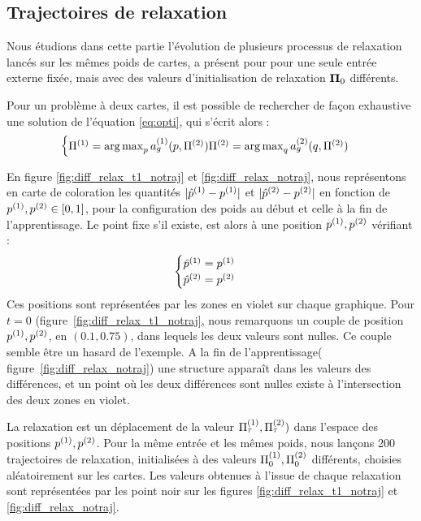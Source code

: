 \documentclass[../main]{subfiles}
\begin{document}
\subsection{Trajectoires de relaxation\label{sec:pf}}

Nous étudions dans cette partie l'évolution de plusieurs processus de relaxation lancés sur les mêmes poids de cartes, a présent pour pour une seule entrée externe fixée, mais avec des valeurs d'initialisation de relaxation $\mathbf{\Pi}_0$ différents.

Pour un problème à deux cartes, il est possible de rechercher de façon exhaustive une solution de l'équation \ref{eq:opti}, qui s'écrit alors : 
\begin{equation}
	\begin{cases}
		\Pi^{({1})} = \operatorname*{arg\,max}_p a_g^{({1})}(p, \Pi^{({2})})
		\Pi^{({2})} = \operatorname*{arg\,max}_q a_g^{({2})}(q, \Pi^{({2})})
	\end{cases}
\end{equation}

En figure \ref{fig:diff_relax_t1_notraj} et \ref{fig:diff_relax_notraj}, nous représentons en carte de coloration les quantités $\lvert \hat{p}^{({1})} - p^{({1})} \rvert$ et $\lvert \hat{p}^{({2})} - p^{({2})}\rvert$ en fonction de $p^{({1})},p^{({2})} \in [0,1]$, pour la configuration des poids au début et celle à la fin de l'apprentissage.
Le point fixe s'il existe, est alors à une position $p^{({1})},p^{({2})}$ vérifiant :
\begin{equation*}
\begin{cases}
\hat{p}^{({1})} = p^{({1})}\\
\hat{p}^{({2})} = p^{({2})}\\
\end{cases}
\end{equation*}
Ces positions sont représentées par les zones en violet sur chaque graphique.
Pour $t = 0$ (figure~\ref{fig:diff_relax_t1_notraj}, nous remarquons un couple de position $p^{({1})}, p^{({2})}$, en $(0.1, 0.75)$, dans lequels les deux valeurs sont nulles. Ce couple semble être un hasard de l'exemple.
A la fin de l'apprentissage( figure~\ref{fig:diff_relax_notraj}) une structure apparaît dans les valeurs des différences, et un point où les deux différences sont nulles existe à l'intersection des deux zones en violet.

La relaxation est un déplacement de la valeur $\Pi^{({1})}_\tau, \Pi^{({2})}_\tau)$ dans l'espace des positions $p^{({1})}, p^{({2})}$. 
Pour la même entrée et les mêmes poids, nous lançons 200 trajectoires de relaxation, initialisées à des valeurs $\Pi^{({1})}_0,\Pi^{({2})}_0$ différents, choisies aléatoirement sur les cartes.
Les valeurs obtenues à l'issue de chaque relaxation sont représentées par les point noir sur les figures \ref{fig:diff_relax_t1_notraj} et \ref{fig:diff_relax_notraj}.
\end{document}
